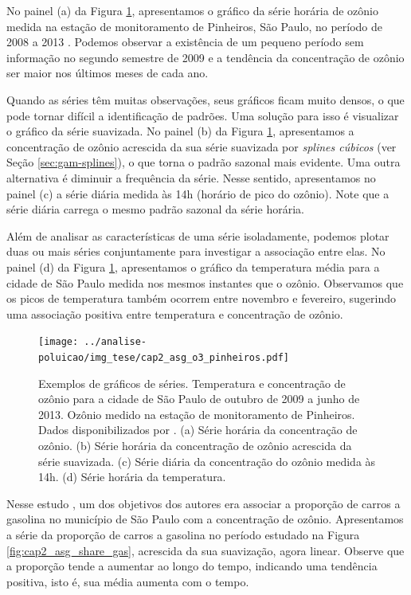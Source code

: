 


No painel (a) da Figura \ref{fig:cap2_asg_o3_pinheiros}, apresentamos o gráfico da série horária de ozônio medida na estação de monitoramento de Pinheiros, São Paulo, no período de 2008 a 2013 \citep{Salvo2017}. Podemos observar a existência de um pequeno período sem informação no segundo semestre de 2009 e a tendência da concentração de ozônio ser maior nos últimos meses de cada ano. 

Quando as séries têm muitas observações, seus gráficos ficam muito densos, o que pode tornar difícil a identificação de padrões. Uma solução para isso é visualizar o gráfico da série suavizada. No painel (b) da Figura \ref{fig:cap2_asg_o3_pinheiros}, apresentamos a concentração de ozônio acrescida da sua série suavizada por \textit{splines cúbicos} (ver Seção \ref{sec:gam-splines}), o que torna o padrão sazonal mais evidente. Uma outra alternativa é diminuir a frequência da série. Nesse sentido, apresentamos no painel (c) a série diária medida às 14h (horário de pico do ozônio). Note que a série diária carrega o mesmo padrão sazonal da série horária. 

Além de analisar as características de uma série isoladamente, podemos plotar duas ou mais séries conjuntamente para investigar a associação entre elas. No painel (d) da Figura \ref{fig:cap2_asg_o3_pinheiros}, apresentamos o gráfico da temperatura média para a cidade de São Paulo medida nos mesmos instantes que o ozônio. Observamos que os picos de temperatura também ocorrem entre novembro e fevereiro, sugerindo uma associação positiva entre temperatura e concentração de ozônio.


\begin{figure}[h!]
	\centering
	\texttt{[image: ../analise-poluicao/img\_tese/cap2\_asg\_o3\_pinheiros.pdf]}
	\caption{Exemplos de gráficos de séries. Temperatura e concentração de ozônio para a cidade de São Paulo de outubro de 2009 a junho de 2013. Ozônio medido na estação de monitoramento de Pinheiros. Dados disponibilizados por \cite{Salvo2017}. (a) Série horária da concentração de ozônio. (b) Série horária da concentração de ozônio acrescida da série suavizada. (c) Série diária da concentração do ozônio medida às 14h. (d) Série horária da temperatura.}
	\label{fig:cap2_asg_o3_pinheiros}
\end{figure}

Nesse estudo \citep{Salvo2014}, um dos objetivos dos autores era associar a proporção de carros a gasolina no município de São Paulo com a concentração de ozônio. Apresentamos a série da proporção de carros a gasolina no período estudado na Figura \ref{fig:cap2_asg_share_gas}, acrescida da sua suavização, agora linear. Observe que a proporção tende a aumentar ao longo do tempo, indicando uma tendência positiva, isto é, sua média aumenta com o tempo.

